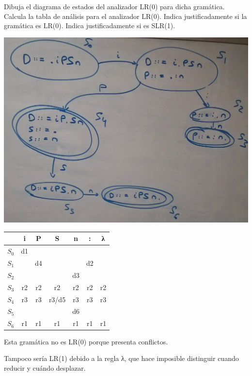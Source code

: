 \documentclass[nochap]{apuntes}
\begin{document}
	
\begin{problem}[4]

\ppart Dibuja el diagrama de estados del analizador LR(0) para dicha gramática.
\ppart Calcula la tabla de análisis para el analizador LR(0).
\ppart Indica justificadamente si la gramática es LR(0). Indica justificadamente si es
SLR(1).
\solution

\spart 
\includegraphics[scale=0.1]{peque.jpg}


\spart 

\begin{tabular}{c||c|c|c|c|c|c}
    & i & P & S & n & : & λ \\\hline\hline
$S_0$  &d1 &   &   &   &   &   \\\hline
$S_1$ &   &d4 &   &   & d2&   \\\hline
$S_2$ &   &   &   & d3&   &   \\\hline
$S_3$ & r2& r2& r2& r2& r2& r2\\\hline
$S_4$ & r3& r3& r3/d5& r3& r3& r3\\\hline
$S_5$ &   &   &   &d6 &   &   \\\hline
$S_6$ &r1 &r1 &r1 &r1 &r1 &r1 
\end{tabular}

\spart Esta gramática no es LR(0) porque presenta conflictos. 

Tampoco sería LR(1) debido a la regla λ, que hace imposible distinguir cuando reducir y cuándo desplazar.
\end{problem}
\newpage
\end{document}
